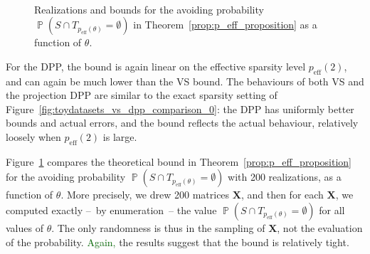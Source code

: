 \documentclass[twoside,11pt]{book}
\newcommand{\rev}[1]{\textcolor{darkgreen}{#1}}
\numberwithin{theorem}{chapter}
\numberwithin{definition}{chapter}
\numberwithin{proposition}{chapter}
\numberwithin{corollary}{chapter}
\numberwithin{example}{chapter}
\numberwithin{lemma}{chapter}
\numberwithin{assumption}{chapter}
\DeclareMathOperator{\eff}{\mathrm{eff}}
\DeclareMathOperator{\Prb}{\mathbb{P}}
\begin{document}
\begin{figure}
    \centering
{}
\\

\caption{Realizations and bounds for the avoiding probability $\Prb(S \cap T_{p_{\mathrm{eff}}(\theta)} = \emptyset)$ in Theorem~\ref{prop:p_eff_proposition} as a function of $\theta$.
\label{fig:toydatasets_avoiding_proba}}
\end{figure}

For the DPP, the bound is again linear on the effective sparsity level $p_{\mathrm{eff}}(2)$, and can again be much lower than the VS bound. The behaviours of both VS and the projection DPP are similar to the exact sparsity setting of Figure~\ref{fig:toydatasets_vs_dpp_comparison_0}: the DPP has uniformly better bounds and actual errors, and the bound reflects the actual behaviour, relatively loosely when $p_{\eff}(2)$ is large.

Figure~\ref{fig:toydatasets_avoiding_proba} compares the theoretical bound in Theorem~\ref{prop:p_eff_proposition} for the avoiding probability $\Prb(S \cap T_{p_{\mathrm{eff}}(\theta)} = \emptyset)$ with 200 realizations, as a function of $\theta$. More precisely, we drew 200 matrices $\bm{X}$, and then for each $\bm{X}$, we computed exactly --~by enumeration~-- the value $\Prb(S \cap T_{p_{\mathrm{eff}}(\theta)} = \emptyset)$ for all values of $\theta$. The only randomness is thus in the sampling of $\bm{X}$, not the evaluation of the probability. \rev{Again, } the results suggest that the bound is relatively tight.
\end{document}
